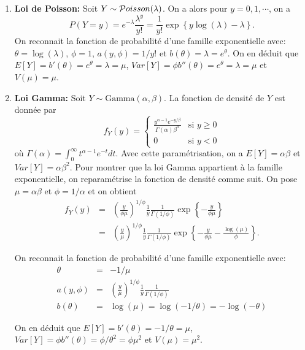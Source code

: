 \documentclass[11pt]{article}
\begin{document}
\begin{enumerate}
On en d\'eduit que $E[Y]=b'(\theta)=m e^{\theta}/(1+e^{\theta})=m\pi$, $Var[Y]=\phi b''(\theta)=me^{\theta}/(1+e^{\theta})^2=m\pi(1-\pi)$ et $V(\mu)=\mu(m-\mu)/m$.

\item[$\bullet$] {\bf Loi de Poisson:} Soit $Y \sim {\cal P}oisson(\lambda)$. On a alors pour $y=0,1,\cdots$, on a $$P(Y=y)=e^{-\lambda} \frac{\lambda^y}{y!}=\frac{1}{y!} \exp\left\{y\log(\lambda)-\lambda\right\}.$$ On reconnait la fonction de probabilit\'e d'une famille exponentielle avec: $\theta=\log(\lambda)$, $\phi=1$, $a(y,\phi)=1/y!$ et $b(\theta)=\lambda = e^{\theta}.$ On en d\'eduit que $E[Y]=b'(\theta)=e^{\theta}=\lambda=\mu$, $Var[Y]=\phi b''(\theta)=e^{\theta}=\lambda=\mu$ et $V(\mu)=\mu$.


\item[$\bullet$] {\bf Loi Gamma:} Soit $Y \sim \mbox{Gamma}(\alpha,\beta)$. La fonction de densit\'e de $Y$ est donn\'ee par 
$$
f_Y(y) = \begin{cases} \frac{y^{\alpha-1}e^{-y/\beta}}{\Gamma(\alpha)\beta^\alpha}  & \mbox{si } y \ge 0 \\
0 & \mbox{si } y<0
\end{cases}
$$
o\`u $\Gamma(\alpha)=\int_0^\infty t^{\alpha-1} e^{-t} dt$. Avec cette param\'etrisation, on a $E[Y]=\alpha\beta$ et $Var[Y]=\alpha \beta^2$. Pour montrer que la loi Gamma appartient \`a la famille exponentielle, on reparam\'etrise la fonction de densit\'e comme suit. On pose $\mu=\alpha\beta$ et $\phi=1/\alpha$ et on obtient
\begin{eqnarray*}
f_Y(y) &=& \left(\frac{y}{\phi\mu}\right)^{1/\phi} \frac{1}{y} \frac{1}{\Gamma(1/\phi)} \exp\left\{-\frac{y}{\phi\mu}\right\}  \\
&=& \left(\frac{y}{\mu}\right)^{1/\phi} \frac{1}{y} \frac{1}{\Gamma(1/\phi)} \exp\left\{-\frac{y}{\phi\mu}-\frac{\log(\mu)}{\phi}\right\}.
\end{eqnarray*}

On reconnait la fonction de probabilit\'e d'une famille exponentielle avec:
\begin{eqnarray*}
\theta &=& -1/\mu \\
a(y,\phi)&=& \left(\frac{y}{\mu}\right)^{1/\phi} \frac{1}{y} \frac{1}{\Gamma(1/\phi)}\\
b(\theta)&=&\log(\mu)=\log(-1/\theta)=-\log(-\theta)
\end{eqnarray*}

On en d\'eduit que $E[Y]=b'(\theta)=-1/\theta=\mu$, $Var[Y]=\phi b''(\theta) = \phi/\theta^2 = \phi \mu^2$ et $V(\mu)=\mu^2$.
\end{enumerate}
\end{document}
